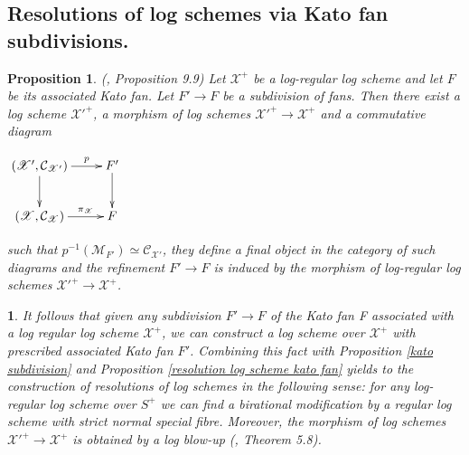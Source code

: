 \documentclass{amsart}%
\numberwithin{equation}{subsection}
\theoremstyle{plain2}
\newtheorem{prop}[equation]{Proposition}
\theoremstyle{definition2}
\theoremstyle{stepstyle}
\theoremstyle{point}
\theoremstyle{subpoint}
\newtheorem{subpoint}[equation]{}%
\newcommand{\spa}[1]{\begin{subpoint}#1\end{subpoint}}           %
\newcommand{\cX}{\ensuremath{\mathscr{X}}}
\newcommand{\caM}{\ensuremath{\mathcal{M}}}
\newcommand{\caC}{\ensuremath{\mathcal{C}}}
\begin{document}
\subsection{Resolutions of log schemes via Kato fan subdivisions.} \label{section resolution via kato subd}
\begin{prop} (\cite{Kato1994a}, Proposition 9.9) \label{prop morphism induced by subdivision kato fan}
Let $\cX^+$ be a log-regular log scheme and let $F$ be its associated Kato fan. Let $F' \rightarrow F$ be a subdivision of fans. Then there exist a log scheme ${\cX'}^+$, a morphism of log schemes ${\cX'}^+ \rightarrow \cX^+$ and a commutative diagram
\begin{center}
$\begin{gathered}
\xymatrixcolsep{2pc} \xymatrix{
  (\cX', \caC_{\cX'}) \ar[r]^-{p} \ar[d]^{} & F' \ar[d]^{}\\
  (\cX, \caC_{\cX}) \ar[r]^-{\pi_{\cX}}   & F
}
\end{gathered}$\end{center}such that $p^{-1}(\caM_{F'}) \simeq \caC_{\cX'}$, they define a final object in the category of such diagrams and the refinement $F'\to F$ is induced by the morphism of log-regular log schemes $\cX'^+ \rightarrow \cX^+$.
\end{prop}

\spa{\label{rem resolution via subd}
It follows that given any subdivision $F' \rightarrow F$ of the Kato fan F associated with a log regular log scheme $\cX^+$, we can construct a log scheme over $\cX^+$ with prescribed associated Kato fan $F'$. Combining this fact with Proposition \ref{kato subdivision} and Proposition \ref{resolution log scheme kato fan} yields to the construction of resolutions of log schemes in the following sense: for any log-regular log scheme over $S^+$ we can find a birational modification by a regular log scheme with strict normal special fibre. Moreover, the morphism of log schemes ${\cX'}^+ \rightarrow \cX^+$ is obtained by a log blow-up  (\cite{Niziol2006}, Theorem 5.8).} 
\end{document}
